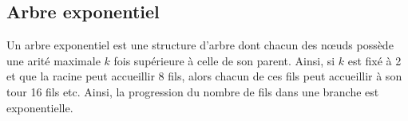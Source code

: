 

\subsection{Arbre exponentiel}
\label{repl:subsec:exponentialtree}

Un arbre exponentiel est une structure d'arbre dont chacun des nœuds possède une
arité maximale $k$ fois supérieure à celle de son parent. Ainsi, si $k$ est fixé
à 2 et que la racine peut accueillir 8 fils, alors chacun de ces fils peut
accueillir à son tour 16 fils etc. Ainsi, la progression du nombre de fils dans
une branche est exponentielle.




